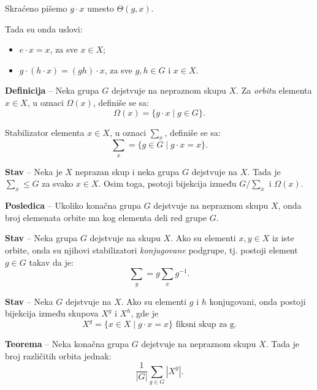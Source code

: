 \documentclass[a4paper,12pt]{article}
\newcommand{\f}[1]{\(#1\)}
\begin{document}
Skraćeno pišemo \f{g \cdot x} umesto \f{\Theta(g, x)}.

Tada su onda uslovi:
\begin{itemize}
  \item \f{e \cdot x = x}, za sve \f{x \in X};
  \item \f{g \cdot (h \cdot x) = (gh) \cdot x}, za sve \f{g, h \in G} i \f{x \in X}.
\end{itemize}

\textbf{Definicija} -- Neka grupa \f{G} dejstvuje na nepraznom skupu \f{X}. Za \emph{orbitu} elementa 
\f{x \in X}, u oznaci \f{\Omega(x)}, definiše se sa:
\[
  \Omega(x) = \{ g \cdot x \mid g \in G \}.
\]

Stabilizator elementa \f{x \in X}, u oznaci \f{\sum_x}, definiše se sa:
\[
  \sum_x = \{ g \in G \mid g \cdot x = x \}.
\]

\textbf{Stav} -- Neka je \f{X} neprazan skup i neka grupa \f{G} dejstvuje na \f{X}. Tada je \f{\sum_x \leq G} za svako \f{x \in X}.
Osim toga, psotoji bijekcija između \f{G/\sum_x} i \f{\Omega(x)}.

\textbf{Posledica} -- Ukoliko konačna grupa \f{G} dejstvuje na nepraznom skupu \f{X}, onda broj elemenata
orbite ma kog elementa deli red grupe \f{G}.

\textbf{Stav} -- Neka grupa \f{G} dejstvuje na skupu \f{X}. Ako su elementi \f{x, y \in X} iz iste orbite, onda su njihovi stabilizatori
\emph{konjugovane} podgrupe, tj. postoji element \f{g \in G} takav da je:
\[
  \sum_y = g \sum_x g^{-1}.
\]

\textbf{Stav} -- Neka \f{G} dejstvuje na \f{X}. Ako su elementi \f{g} i \f{h} konjugovani, onda 
postoji bijekcija između skupova \f{X^g} i \f{X^h}, gde je
\[
  X^g = \{ x \in X \mid g \cdot x = x \} \text{ fiksni skup za g.}
\] 

\textbf{Teorema} -- Neka konačna grupa \f{G} dejstvuje na nepraznom skupu \f{X}. Tada je broj
različitih orbita jednak:
\[
  \frac{1}{|G|} \sum_{g \in G} |X^g|.
\]
\end{document}
